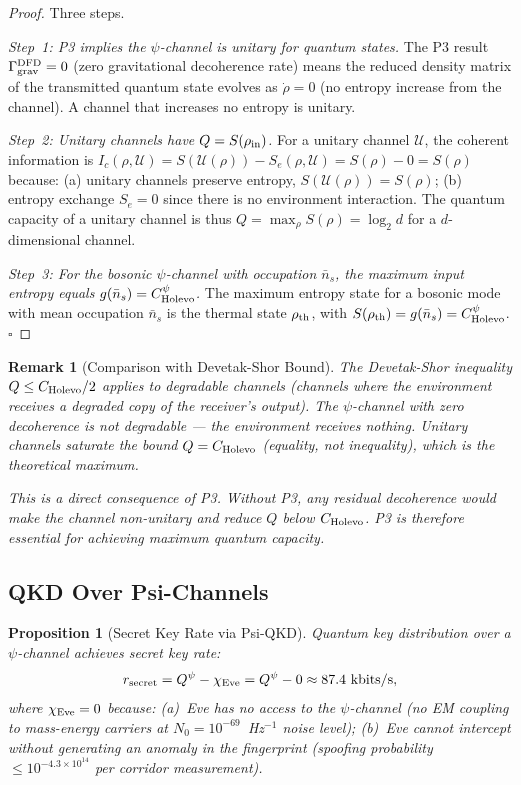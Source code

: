 \documentclass[aps,prd,twocolumn,superscriptaddress,nofootinbib]{revtex4-2}
\newtheorem{proposition}[theorem]{Proposition}
\newtheorem{remark}{Remark}
\begin{document}
\begin{proof}
Three steps.

\emph{Step~1: P3 implies the $\psi$-channel is unitary for quantum states.}
The P3 result $\Gamma_{\rm grav}^{\rm DFD} = 0$ (zero gravitational
decoherence rate) means the reduced density matrix of the transmitted
quantum state evolves as $\dot\rho = 0$ (no entropy increase from the
channel). A channel that increases no entropy is unitary.

\emph{Step~2: Unitary channels have $Q = S(\rho_{\rm in})$.}
For a unitary channel $\mathcal{U}$, the coherent information is
$I_c(\rho, \mathcal{U}) = S(\mathcal{U}(\rho)) - S_e(\rho, \mathcal{U})
= S(\rho) - 0 = S(\rho)$ because: (a) unitary channels preserve entropy,
$S(\mathcal{U}(\rho)) = S(\rho)$; (b) entropy exchange $S_e = 0$ since
there is no environment interaction. The quantum capacity of a unitary
channel is thus $Q = \max_\rho S(\rho) = \log_2 d$ for a $d$-dimensional
channel.

\emph{Step~3: For the bosonic $\psi$-channel with occupation $\bar{n}_s$,
the maximum input entropy equals $g(\bar{n}_s) = C_{\rm Holevo}^\psi$.}
The maximum entropy state for a bosonic mode with mean occupation
$\bar{n}_s$ is the thermal state $\rho_{\rm th}$, with
$S(\rho_{\rm th}) = g(\bar{n}_s) = C_{\rm Holevo}^\psi$. $\square$
\end{proof}

\begin{remark}[Comparison with Devetak-Shor Bound]
The Devetak-Shor inequality $Q \leq C_{\rm Holevo}/2$ applies to
\emph{degradable} channels (channels where the environment receives
a degraded copy of the receiver's output). The $\psi$-channel with zero
decoherence is not degradable --- the environment receives nothing.
Unitary channels saturate the bound $Q = C_{\rm Holevo}$ (equality, not
inequality), which is the theoretical maximum.

This is a direct consequence of P3. Without P3, any residual decoherence
would make the channel non-unitary and reduce $Q$ below $C_{\rm Holevo}$.
P3 is therefore \emph{essential} for achieving maximum quantum capacity.
\end{remark}

\subsection{QKD Over Psi-Channels}

\begin{proposition}[Secret Key Rate via Psi-QKD]
\label{prop:qkd-rate}
Quantum key distribution over a $\psi$-channel achieves secret key rate:
\begin{equation}
r_{\rm secret} = Q^\psi - \chi_{\rm Eve} = Q^\psi - 0 \approx 87.4~\text{kbits/s},
\end{equation}
where $\chi_{\rm Eve} = 0$ because:
(a)~Eve has no access to the $\psi$-channel (no EM coupling to mass-energy
carriers at $N_0 = 10^{-69}$~Hz$^{-1}$ noise level);
(b)~Eve cannot intercept without generating an anomaly in the fingerprint
(spoofing probability $\leq 10^{-4.3\times10^{14}}$ per corridor measurement).
\end{proposition}
\end{document}
